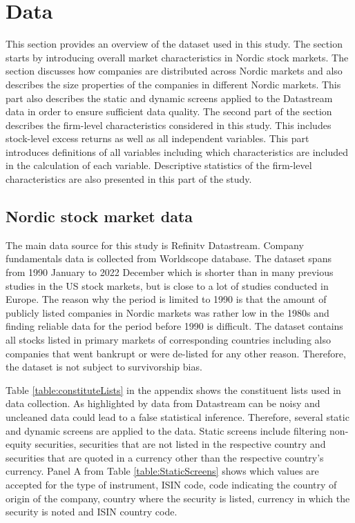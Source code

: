 \documentclass[12pt]{article}
\begin{document}
\section{Data}\label{Data}

This section provides an overview of the dataset used in this study. The section starts by introducing overall market characteristics in Nordic stock markets. The section discusses how companies are distributed across Nordic markets and also describes the size properties of the companies in different Nordic markets. This part also describes the static and dynamic screens applied to the Datastream data in order to ensure sufficient data quality. The second part of the section describes the firm-level characteristics considered in this study. This includes stock-level excess returns as well as all independent variables. This part introduces definitions of all variables including which characteristics are included in the calculation of each variable. Descriptive statistics of the firm-level characteristics are also presented in this part of the study. \par

\subsection{Nordic stock market data}\label{NordicStockMarketData}

The main data source for this study is Refinitv Datastream. Company fundamentals data is collected from Worldscope database. The dataset spans from 1990 January to 2022 December which is shorter than in many previous studies in the US stock markets, but is close to a lot of studies conducted in Europe.\footnotemark {} The reason why the period is limited to 1990 is that the amount of publicly listed companies in Nordic markets was rather low in the 1980s and finding reliable data for the period before 1990 is difficult. The dataset contains all stocks listed in primary markets of corresponding countries including also companies that went bankrupt or were de-listed for any other reason. Therefore, the dataset is not subject to survivorship bias. \par

Table \ref{table:constituteLists} in the appendix shows the constituent lists used in data collection. As highlighted by \citet{Ince2006} data from Datastream can be noisy and uncleaned data could lead to a false statistical inference.\footnotemark {} Therefore, several static and dynamic screens are applied to the data. Static screens include filtering non-equity securities, securities that are not listed in the respective country and securities that are quoted in a currency other than the respective country's currency. Panel A from Table \ref{table:StaticScreens} shows which values are accepted for the type of instrument, ISIN code, code indicating the country of origin of the company, country where the security is listed, currency in which the security is noted and ISIN country code. \par
\end{document}

